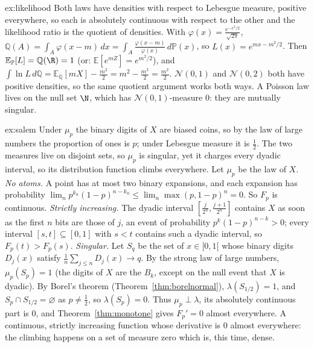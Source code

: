 \begin{solution}{ex:likelihood}
\idea Both laws have densities with respect to Lebesgue measure, positive everywhere, so each is absolutely continuous with respect to the other and the likelihood ratio is the quotient of
densities.
\writeup With $\varphi(x)=\frac{e^{-x^2/2}}{\sqrt{2\pi}}$, $\mathbb Q(A)=\int_A\varphi(x-m)\,dx=\int_A\frac{\varphi(x-m)}{\varphi(x)}\,d\mathbb P(x)$, so $L(x)=e^{mx-m^2/2}$. Then $\mathbb E_{\mathbb P}[L]=\mathbb Q(\R)=1$ (or: $\mathbb E[e^{mZ}]=e^{m^2/2}$), and
$\int\ln L\,d\mathbb Q=\mathbb E_{\mathbb Q}[mX]-\frac{m^2}2=m^2-\frac{m^2}2=\frac{m^2}2$. $\mathcal N(0,1)$ and $\mathcal N(0,2)$ both have positive densities, so the same quotient argument works both ways. A Poisson law lives on the null set
$\N$, which has $\mathcal N(0,1)$-measure $0$: they are mutually singular.
\end{solution}

\begin{solution}{ex:salem}
\idea Under $\mu_p$ the binary digits of $X$ are biased coins, so by the law of large numbers the proportion of ones is $p$; under Lebesgue measure it is $\frac12$. The two measures live on disjoint sets, so
$\mu_p$ is singular, yet it charges every dyadic interval, so its distribution function climbs everywhere.
\writeup Let $\mu_p$ be the law of $X$. \emph{No atoms.} A point has at most two binary expansions, and each expansion has probability $\lim_np^{k_n}(1-p)^{n-k_n}\le\lim_n\max(p,1-p)^n=0$. So $F_p$ is continuous.
\emph{Strictly increasing.} The dyadic interval $[\frac j{2^n},\frac{j+1}{2^n}]$ contains $X$ as soon as the first $n$ bits are those of $j$, an event of probability $p^k(1-p)^{n-k}>0$; every interval $[s,t]\subseteq[0,1]$ with $s<t$ contains
such a dyadic interval, so $F_p(t)>F_p(s)$. \emph{Singular.} Let $S_q$ be the set of $x\in[0,1[$ whose binary digits $D_j(x)$ satisfy $\frac1n\sum_{j\le n}D_j(x)\to q$. By the strong law of large numbers, $\mu_p(S_p)=1$ (the digits of $X$ are the
$B_k$, except on the null event that $X$ is dyadic). By Borel's theorem (Theorem~\ref{thm:borelnormal}), $\lambda(S_{1/2})=1$, and $S_p\cap S_{1/2}=\varnothing$ as $p\ne\frac12$, so $\lambda(S_p)=0$. Thus $\mu_p\perp\lambda$, its absolutely
continuous part is $0$, and Theorem~\ref{thm:monotone} gives $F_p'=0$ almost everywhere. A continuous, strictly increasing function whose derivative is $0$ almost everywhere: the climbing happens on a set of
measure zero which is, this time, dense.
\end{solution}

